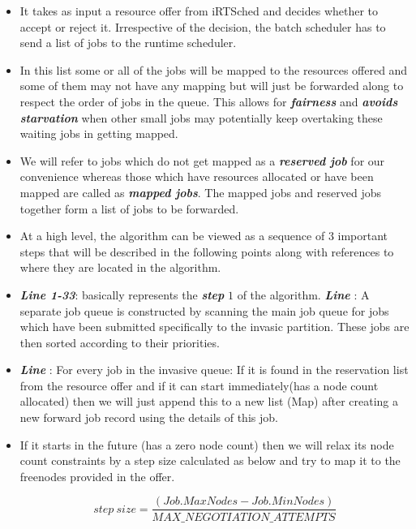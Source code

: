 \begin{itemize}
\item It takes as input a resource offer from iRTSched and decides whether to accept or reject it. Irrespective of the decision, the batch scheduler has to send a list of jobs to the runtime scheduler. 
\item In this list some or all of the jobs will be mapped to the resources offered and some of them may not have any mapping but will just be forwarded along to respect the order of jobs in the queue. This allows for \textbf{\textit{fairness}} and \textbf{\textit{avoids starvation}} when other small jobs may potentially keep overtaking these waiting jobs in getting mapped.
\item We will refer to jobs which do not get mapped as a \textbf{\textit{reserved job}} for our convenience whereas those which have resources allocated or have been mapped are called as \textbf{\textit{mapped jobs}}. The mapped jobs and reserved jobs together form a list of jobs to be forwarded.  
\item At a high level, the algorithm can be viewed as a sequence of $3$ important steps that will be described in the following points along with references to where they are located in the algorithm.
\item \textbf{\textit{Line 1-33}}: basically represents the \textbf{\textit{step}} $1$ of the algorithm. \textbf{\textit{Line }}: A separate job queue is constructed by scanning the main job queue for jobs which have been submitted specifically to the invasic partition. These jobs are then sorted according to their priorities.
\item \textbf{\textit{Line }}: For every job in the invasive queue: If it is found in the reservation list from the resource offer and if it can start immediately(has a node count allocated) then we will just append this to a new list (Map) after creating a new forward job record using the details of this job.
\item If it starts in the future (has a zero node count) then we will relax its node count constraints by a step size calculated as below and try to map it to the freenodes provided in the offer.
\vspace{-0.30in}
\begin{center}
\boldmath\begin{equation*}
step\ size = \frac{(Job.MaxNodes - Job.MinNodes)}{MAX\_NEGOTIATION\_ATTEMPTS}
\end{equation*}
\end{center}

\end{itemize}
